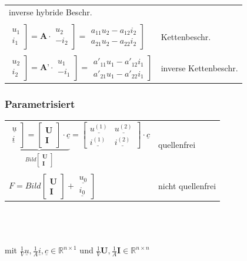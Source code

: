 \documentclass[a4paper,twocolumn,10pt]{article}
\begin{document}
\begin{tabular}{ll}
inverse hybride Beschr.\\\\
$\left.\begin{matrix}u_1\\i_1\end{matrix}\right] =\textbf{A}\cdot \left.\begin{matrix}u_2\\-i_2\end{matrix}\right]=\left.\begin{matrix}a_{11}u_2-a_{12}i_2\\a_{21}u_2-a_{22}i_2\end{matrix}\right]$ &
Kettenbeschr.\\\\
$\left.\begin{matrix}u_2\\i_2\end{matrix}\right] =\textbf{A'}\cdot \left.\begin{matrix}u_1\\-i_1\end{matrix}\right]=\left.\begin{matrix}a'_{11}u_1-a'_{12}i_1\\a'_{21}u_1-a'_{22}i_1\end{matrix}\right]$ &
inverse Kettenbeschr.
\end{tabular}
\subsubsection*{Parametrisiert}
\begin{tabular}{ll}
$\underbrace{\left.\begin{matrix}\underline{u}\\\underline{i}\end{matrix}\right]=\begin{bmatrix}\textbf{U} \\ \textbf{I}\end{bmatrix}\cdot \underline{c}}_{Bild\begin{bmatrix}\textbf{U} \\ \textbf{I}\end{bmatrix}}=\begin{bmatrix}\underline{u^{(1)}} & \underline{u^{(2)}}\\ \underline{i^{(1)}} & \underline{i^{(2)}}\end{bmatrix}\cdot \underline{c}$ & quellenfrei\\\\
$F=Bild\begin{bmatrix}\textbf{U} \\ \textbf{I}\end{bmatrix}+\left.\begin{matrix}\underline{u_0}\\\underline{i_0}\end{matrix}\right]$ & nicht quellenfrei
\end{tabular}\\\\\\
mit $\frac{1}{V}\underline{u},\frac{1}{A}\underline{i},\underline{c}\in \mathbb{R}^{n\times 1}$ und $\frac{1}{V}\textbf{U},\frac{1}{A}\textbf{I}\in \mathbb{R}^{n\times n}$
\end{document}

